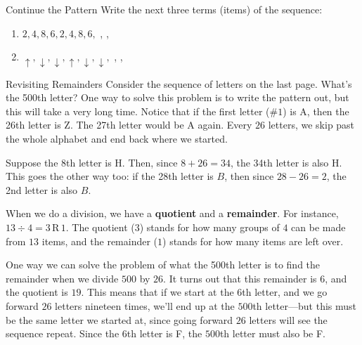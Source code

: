 \documentclass[12pt,letterpaper]{article}
\begin{document}
\begin{problem}{Continue the Pattern}
Write the next three terms (items) of the sequence:

\begin{enumerate}[\hspace{.5cm}a.]
\item $2, 4, 8, 6, 2, 4, 8, 6,$ \underline{\hspace{1em}},
\underline{\hspace{1em}}, \underline{\hspace{1em}}
\item $\uparrow, \downarrow, \downarrow, \uparrow, \downarrow, \downarrow,$
\underline{\hspace{1em}}, \underline{\hspace{1em}}, \underline{\hspace{1em}}
\end{enumerate}
\end{problem}

\begin{step}{Revisiting Remainders}
Consider the sequence of letters on the last page. What's the 500th letter? One
way to solve this problem is to write the pattern out, but this will take a very
long time. Notice that if the first letter (\#$1$) is A, then the 26th letter is
Z. The 27th letter would be A again. Every $26$ letters, we skip past the whole
alphabet and end back where we started.

Suppose the 8th letter is H. Then, since $8+26=34$, the 34th letter is also H.
This goes the other way too: if the 28th letter is $B$, then since $28-26=2$,
the 2nd letter is also $B$.

When we do a division, we have a \textbf{quotient} and a \textbf{remainder}. For
instance, $13 \div 4 = 3\,\mathrm{R}\,1$. The quotient ($3$) stands for how many
groups of $4$ can be made from $13$ items, and the remainder ($1$) stands for
how many items are left over.

One way we can solve the problem of what the 500th letter is to find the
remainder when we divide $500$ by $26$. It turns out that this remainder is $6$,
and the quotient is $19$. This means that if we start at the $6$th letter, and
we go forward $26$ letters nineteen times, we'll end up at the $500$th
letter---but this must be the same letter we started at, since going forward
$26$ letters will see the sequence repeat. Since the $6$th letter is F, the
$500$th letter must also be F.
\end{step}
\end{document}
